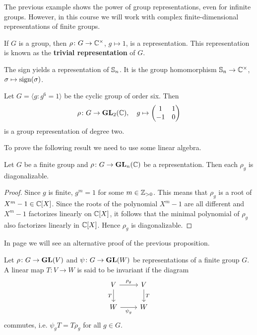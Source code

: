 The previous example shows the power of group representations, even for infinite groups.   
However, in this course we will work with complex finite-dimensional 
representations of finite
groups.  

\begin{example}
	If $G$ is a group, then $\rho\colon G\to\mathbb{C}^\times$, $g\mapsto 1$, 
	is a representation. This representation is known as the \textbf{trivial representation} of $G$. 	
\end{example}

\begin{example}
	The sign yields a representation of $\mathbb{S}_n$. It is the group homomorphism
	$\mathbb{S}_n\to\mathbb{C}^\times$, $\sigma\mapsto\operatorname{sign}(\sigma)$.  	
\end{example}

\begin{example}
	Let $G=\langle g:g^6=1\rangle$ be the cyclic group of order six. Then
	\[
	\rho\colon G\to\mathbf{GL}_2(\mathbb{C}),
	\quad 
	g\mapsto\begin{pmatrix}1&1\\-1&0\end{pmatrix}
	\] 
	is a group representation of degree two. 
\end{example}

To prove the following result we need
to use some linear algebra. 

\begin{proposition}
    Let $G$ be a finite group and $\rho\colon G\to\mathbf{GL}_n(\mathbb{C})$ 
    be a representation. Then
    each $\rho_g$ is diagonalizable.
\end{proposition}

\begin{proof}
    Since $g$ is finite, $g^m=1$ for some $m\in\mathbb{Z}_{>0}$. This means that $\rho_g$ is a root of $X^m-1\in\mathbb{C}[X]$. Since
    the roots of the polynomial $X^m-1$ are all different and $X^m-1$ factorizes linearly on $\mathbb{C}[X]$, it follows
    that the minimal polynomial of $\rho_g$ also factorizes linearly in $\mathbb{C}[X]$. Hence $\rho_g$ is diagonalizable.
\end{proof}

In page \pageref{rho_diagonalizable} we will see an alternative  
proof of the previous proposition. 

\begin{definition}
    Let $\rho\colon G\to\mathbf{GL}(V)$ and $\psi\colon G\to\mathbf{GL}(W)$ be
    representations of a finite group $G$. A linear map $T\colon V\to W$ is said to be invariant
    if the diagram
    \[\begin{tikzcd}
	V & V \\
	W & W
	\arrow["{\rho_g}", from=1-1, to=1-2]
	\arrow["T"', from=1-1, to=2-1]
	\arrow["{\psi_g}"', from=2-1, to=2-2]
	\arrow["T", from=1-2, to=2-2]
\end{tikzcd}\]
    commutes, i.e. $\psi_gT=T\rho_g$ for all $g\in G$.
\end{definition}

